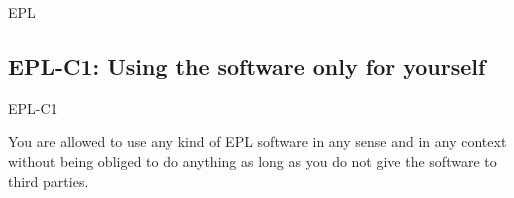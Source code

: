 \begin{license}{EPL}
\newcommand{\markAllModifications}{Mark all modifications of the source code of
  the program thoroughly; namely within the modfied source code.}

\newcommand{\organizeYourModifications}{Organize your modifications in a way
  that they are covered by the existing EPL licensing statements.}
\newcommand{\addHeaderToNewFiles}{If you add new source code files, insert a
  header containing your copyright line and an EPL adequate licensing the
  statement.} 

\newcommand{\useSeparateDirectory}[1]{Arrange your #1 distribution so that the
  integrated EPL and the \emph{licensing files} clearly refer only to the
  embedded library and do not disturb the licensing of your own overarching
  work. It's a good tradition to keep the embedded components like libraries,
  modules, snippets, or plugins in separate directories which also contains all 
  additional licensing elements.}

\subsection{EPL-C1: Using the software only for yourself}
\begin{lsuc}{EPL-C1}



  \begin{lsucrequiresnothing}
    \item You are allowed to use any kind of EPL software in any sense and in
    any context without being obliged to do anything as long as you do not
    give the software to third parties.
  \end{lsucrequiresnothing}


\end{lsuc}
\end{license}
